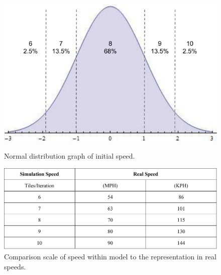 \documentclass{amsart}
\begin{document}
	
	
	
	
	
\begin{figure}[h]
\begin{center}
\includegraphics[scale=0.65]{MCM-speedsnormaldist}
\caption{Normal distribution graph of initial speed.}
\renewcommand{\figurename}{}
\label{MCMNormDist}
\end{center}
\end{figure}
		
\begin{figure}[h]
\begin{center}
\includegraphics[scale=0.5]{MCM-SimulationSpeedTable.pdf}
\caption{Comparison scale of speed within model to the representation in real speeds.}
\renewcommand{\figurename}{Speed Scaling}

\end{center}
\end{figure}	
	
	
	
	
	
	
	
	
	
	


	
	
\end{document}
